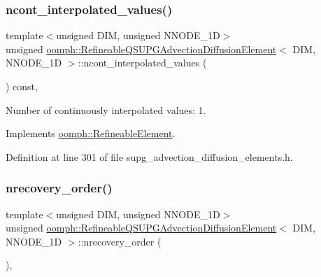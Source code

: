 \subsubsection{\texorpdfstring{ncont\+\_\+interpolated\+\_\+values()}{ncont\_interpolated\_values()}}
{\footnotesize\ttfamily template$<$unsigned D\+IM, unsigned N\+N\+O\+D\+E\+\_\+1D$>$ \\
unsigned \hyperlink{classoomph_1_1RefineableQSUPGAdvectionDiffusionElement}{oomph\+::\+Refineable\+Q\+S\+U\+P\+G\+Advection\+Diffusion\+Element}$<$ D\+IM, N\+N\+O\+D\+E\+\_\+1D $>$\+::ncont\+\_\+interpolated\+\_\+values (\begin{DoxyParamCaption}{ }\end{DoxyParamCaption}) const\hspace{0.3cm}{\ttfamily [inline]}, {\ttfamily [virtual]}}



Number of continuously interpolated values\+: 1. 



Implements \hyperlink{classoomph_1_1RefineableElement_a53e171a18c9f43f1db90a6876516a073}{oomph\+::\+Refineable\+Element}.



Definition at line 301 of file supg\+\_\+advection\+\_\+diffusion\+\_\+elements.\+h.

\mbox{\label{classoomph_1_1RefineableQSUPGAdvectionDiffusionElement_a9b52030e939258716797d985a64671ce}} 
\subsubsection{\texorpdfstring{nrecovery\+\_\+order()}{nrecovery\_order()}}
{\footnotesize\ttfamily template$<$unsigned D\+IM, unsigned N\+N\+O\+D\+E\+\_\+1D$>$ \\
unsigned \hyperlink{classoomph_1_1RefineableQSUPGAdvectionDiffusionElement}{oomph\+::\+Refineable\+Q\+S\+U\+P\+G\+Advection\+Diffusion\+Element}$<$ D\+IM, N\+N\+O\+D\+E\+\_\+1D $>$\+::nrecovery\+\_\+order (\begin{DoxyParamCaption}{ }\end{DoxyParamCaption})\hspace{0.3cm}{\ttfamily [inline]}, {\ttfamily [virtual]}}



